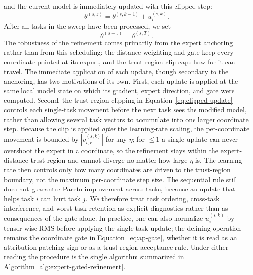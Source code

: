 \documentclass[11pt]{article}
\begin{document}
and the current model is immediately updated with this clipped step:
\begin{equation}
    \theta^{(s,k)}
    =
    \theta^{(s,k-1)} + u_i^{(s,k)}.
    \label{eq:sequential-single-task-update}
\end{equation}
After all tasks in the sweep have been processed, we set
\begin{equation}
    \theta^{(s+1)}=\theta^{(s,T)}.
    \label{eq:sequential-sweep-update}
\end{equation}
The robustness of the refinement comes primarily from the expert anchoring rather than from this scheduling: the distance weighting and gate keep every coordinate pointed at its expert, and the trust-region clip caps how far it can travel. The immediate application of each update, though secondary to the anchoring, has two motivations of its own. First, each update is applied at the same local model state on which its gradient, expert direction, and gate were computed. Second, the trust-region clipping in Equation~\eqref{eq:clipped-update} controls each single-task movement before the next task sees the modified model, rather than allowing several task vectors to accumulate into one larger coordinate step. Because the clip is applied \emph{after} the learning-rate scaling, the per-coordinate movement is bounded by $|v_{i,r}^{(s,k)}|$ for any $\eta$; for $\le 1$ a single update can never overshoot the expert in a coordinate, so the refinement stays within the expert-distance trust region and cannot diverge no matter how large $\eta$ is. The learning rate then controls only how many coordinates are driven to the trust-region boundary, not the maximum per-coordinate step size. The sequential rule still does not guarantee Pareto improvement across tasks, because an update that helps task $i$ can hurt task $j$. We therefore treat task ordering, cross-task interference, and worst-task retention as explicit diagnostics rather than as consequences of the gate alone. In practice, one can also normalize $u_i^{(s,k)}$ by tensor-wise RMS before applying the single-task update; the defining operation remains the coordinate gate in Equation~\eqref{eq:ap-gate}, whether it is read as an attribution-patching sign or as a trust-region acceptance rule. Under either reading the procedure is the single algorithm summarized in Algorithm~\ref{alg:expert-gated-refinement}.
\end{document}
